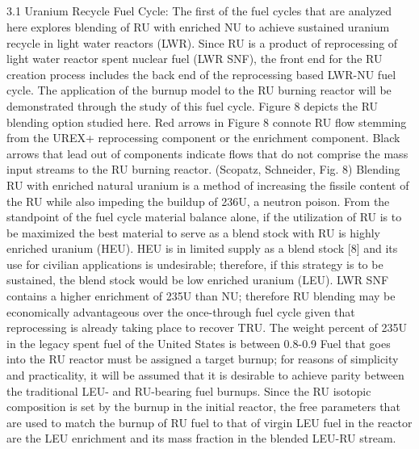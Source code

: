 \subsection{}
\label{1g_sec:}
3.1 Uranium Recycle Fuel Cycle:
The first of the fuel cycles that are analyzed here explores blending of RU with enriched NU to achieve sustained uranium recycle in light water reactors (LWR).  Since RU is a product of reprocessing of light water reactor spent nuclear fuel (LWR SNF), the front end for the RU creation process includes the back end of the reprocessing based LWR-NU fuel cycle.  The application of the burnup model to the RU burning reactor will be demonstrated through the study of this fuel cycle.
Figure 8 depicts the RU blending option studied here.  Red arrows in Figure 8 connote RU flow stemming from the UREX+ reprocessing component or the enrichment component.  Black arrows that lead out of components indicate flows that do not comprise the mass input streams to the RU burning reactor.  
(Scopatz, Schneider, Fig. 8)
Blending RU with enriched natural uranium is a method of increasing the fissile content of the RU while also impeding the buildup of 236U, a neutron poison.  From the standpoint of the fuel cycle material balance alone, if the utilization of RU is to be maximized the best material to serve as a blend stock with RU is highly enriched uranium (HEU).  HEU is in limited supply as a blend stock [8] and its use for civilian applications is undesirable; therefore, if this strategy is to be sustained, the blend stock would be low enriched uranium (LEU).  
LWR SNF contains a higher enrichment of 235U than NU; therefore RU blending may be economically advantageous over the once-through fuel cycle given that reprocessing is already taking place to recover TRU. The weight percent of 235U in the legacy spent fuel of the United States is between 0.8-0.9%
Fuel that goes into the RU reactor must be assigned a target burnup; for reasons of simplicity and practicality, it will be assumed that it is desirable to achieve parity between the traditional LEU- and RU-bearing fuel burnups.  Since the RU isotopic composition is set by the burnup in the initial reactor, the free parameters that are used to match the burnup of RU fuel to that of virgin LEU fuel in the reactor are the LEU enrichment and its mass fraction in the blended LEU-RU stream.    
